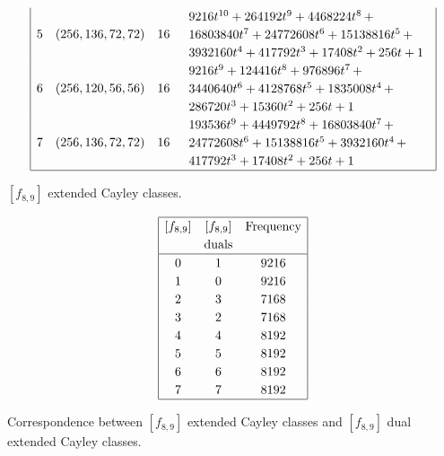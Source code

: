 \documentclass[12pt,a4paper]{article}
\begin{document}
\begin{table}[!bhpt]
\begin{align*}
\begin{array}{|cccl|}
5 &
(256, 136, 72, 72) &
16 &
\begin{array}{l}
9216t^{10} + 264192t^{9} + 4468224t^{8}
\,+
\\
 16803840t^{7} + 24772608t^{6} + 15138816t^{5}
\,+
\\
 3932160t^{4} + 417792t^{3} + 17408t^{2} + 256t + 1
\end{array}
\\
6 &
(256, 120, 56, 56) &
16 &
\begin{array}{l}
9216t^{9} + 124416t^{8} + 976896t^{7}
\,+
\\
 3440640t^{6} + 4128768t^{5} + 1835008t^{4}
\,+
\\
 286720t^{3} + 15360t^{2} + 256t + 1
\end{array}
\\
7 &
(256, 136, 72, 72) &
16 &
\begin{array}{l}
193536t^{9} + 4449792t^{8} + 16803840t^{7}
\,+
\\
 24772608t^{6} + 15138816t^{5} + 3932160t^{4}
\,+
\\
 417792t^{3} + 17408t^{2} + 256t + 1
\end{array}
\\
\hline
\end{array}
\end{align*}
\caption{$[f_{8,9}]$ extended Cayley classes.}
\label{tab-c8_9_EC_classes}
\end{table}

\begin{table}
\small{}
\begin{align*}
\def\arraystretch{1.2}
\begin{array}{|ccc|}
\hline
[f_{8,9}] &
[f_{8,9}] &
\text{Frequency}
\\
&
\text{duals} &
\\
\hline
0 &   1 & 9216
\\
1 &   0 & 9216
\\
2 &   3 & 7168
\\
3 &   2 & 7168
\\
4 &   4 & 8192
\\
5 &   5 & 8192
\\
6 &   6 & 8192
\\
7 &   7 & 8192
\\
\hline
\end{array}
\end{align*}
\caption{Correspondence between $[f_{8,9}]$ extended Cayley classes and $[f_{8,9}]$ dual extended Cayley classes.}
\label{tab-c8_9-dual-EC_classes}
\end{table}
\end{document}
